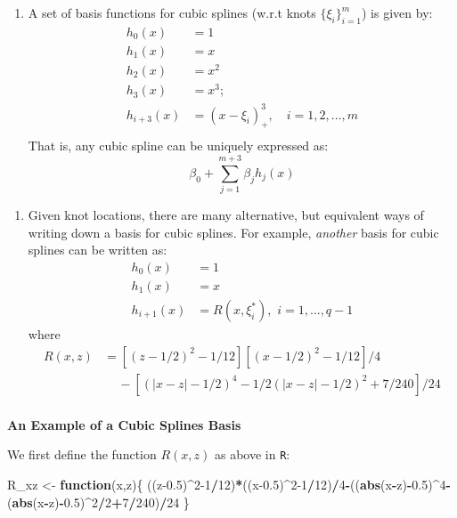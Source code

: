 \documentclass[
]{book}
\newenvironment{Shaded}{\begin{snugshade}}{\end{snugshade}}
\newcommand{\ControlFlowTok}[1]{\textcolor[rgb]{0.13,0.29,0.53}{\textbf{#1}}}
\newcommand{\DecValTok}[1]{\textcolor[rgb]{0.00,0.00,0.81}{#1}}
\newcommand{\FloatTok}[1]{\textcolor[rgb]{0.00,0.00,0.81}{#1}}
\newcommand{\FunctionTok}[1]{\textcolor[rgb]{0.13,0.29,0.53}{\textbf{#1}}}
\newcommand{\NormalTok}[1]{#1}
\newcommand{\OtherTok}[1]{\textcolor[rgb]{0.56,0.35,0.01}{#1}}
\newcommand{\SpecialCharTok}[1]{\textcolor[rgb]{0.81,0.36,0.00}{\textbf{#1}}}
\providecommand{\tightlist}{%
  \setlength{\itemsep}{0pt}\setlength{\parskip}{0pt}}
\begin{document}
\begin{enumerate}
\def\labelenumi{\arabic{enumi}.}
\tightlist
\item
  A set of basis functions for cubic splines (w.r.t knots \(\{\xi_i\}_{i=1}^m\)) is given by:
  \begin{align*}
    h_0(x)&= 1\\
     h_1(x)&=x\\
    h_2(x)&=x^2\\
    h_3(x)&=x^3;\\
    h_{i+3}(x) &= (x-\xi_i)_+^3,\quad i=1,2,\ldots,m\\
  \end{align*}
  That is, any cubic spline can be uniquely expressed as:
  \[ \beta_0 +\sum_{j=1}^{m+3}\beta_j h_j(x)\]
\end{enumerate}

\begin{enumerate}
\def\labelenumi{\arabic{enumi}.}
\setcounter{enumi}{1}
\tightlist
\item
  Given knot locations, there are many alternative, but equivalent ways of writing down a basis for cubic splines. For example, \emph{another} basis for cubic splines can be written as:
  \begin{align*}
  h_0(x) &= 1\\
  h_1(x) &= x\\
  h_{i+1}(x) &= R(x, \xi_i^*),\,\, i=1, \ldots, q-1
  \end{align*}
  where
  \begin{align*}
  R(x,z) &= \left[  (z-1/2)^2 - 1/12\right] \left[  (x-1/2)^2 - 1/12\right]/4\\
  & \quad \,- \left[  (|x-z|-1/2)^4 - 1/2   (|x-z|-1/2)^2 + 7/240\right] /24\\
  \end{align*}
\end{enumerate}

\textbf{An Example of a Cubic Splines Basis}

We first define the function \(R(x,z)\) as above in \texttt{R}:

\begin{Shaded}
\begin{Highlighting}[]
\NormalTok{R\_xz }\OtherTok{\textless{}{-}} \ControlFlowTok{function}\NormalTok{(x,z)\{}
\NormalTok{  ((z}\FloatTok{{-}0.5}\NormalTok{)}\SpecialCharTok{\^{}}\DecValTok{2{-}1}\SpecialCharTok{/}\DecValTok{12}\NormalTok{)}\SpecialCharTok{*}\NormalTok{((x}\FloatTok{{-}0.5}\NormalTok{)}\SpecialCharTok{\^{}}\DecValTok{2{-}1}\SpecialCharTok{/}\DecValTok{12}\NormalTok{)}\SpecialCharTok{/}\DecValTok{4}\SpecialCharTok{{-}}\NormalTok{((}\FunctionTok{abs}\NormalTok{(x}\SpecialCharTok{{-}}\NormalTok{z)}\SpecialCharTok{{-}}\FloatTok{0.5}\NormalTok{)}\SpecialCharTok{\^{}}\DecValTok{4}\SpecialCharTok{{-}}\NormalTok{(}\FunctionTok{abs}\NormalTok{(x}\SpecialCharTok{{-}}\NormalTok{z)}\SpecialCharTok{{-}}\FloatTok{0.5}\NormalTok{)}\SpecialCharTok{\^{}}\DecValTok{2}\SpecialCharTok{/}\DecValTok{2}\SpecialCharTok{+}\DecValTok{7}\SpecialCharTok{/}\DecValTok{240}\NormalTok{)}\SpecialCharTok{/}\DecValTok{24}
\NormalTok{\}}
\end{Highlighting}
\end{Shaded}
\end{document}
